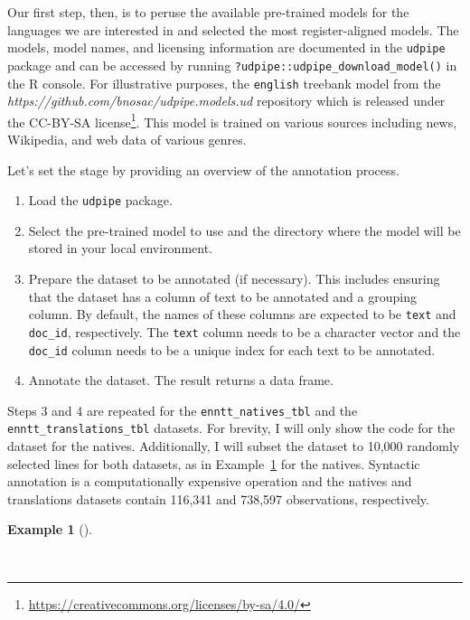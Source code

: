 \documentclass[
  letterpaper,
]{latex/krantz}
\providecommand{\tightlist}{%
  \setlength{\itemsep}{0pt}\setlength{\parskip}{0pt}}\usepackage{longtable,booktabs,array}
\theoremstyle{definition}
\newtheorem{example}{Example}[chapter]
\theoremstyle{remark}
\DeclareRobustCommand{\href}[2]{#2\footnote{\url{#1}}}
\begin{document}
Our first step, then, is to peruse the available pre-trained models for
the languages we are interested in and selected the most
register-aligned models. The models, model names, and licensing
information are documented in the \texttt{udpipe} package and can be
accessed by running \texttt{?udpipe::udpipe\_download\_model()} in the R
console. For illustrative purposes, the \texttt{english} treebank model
from the \emph{https://github.com/bnosac/udpipe.models.ud} repository
which is released under the
\href{https://creativecommons.org/licenses/by-sa/4.0/}{CC-BY-SA
license}. This model is trained on various sources including news,
Wikipedia, and web data of various genres.

Let's set the stage by providing an overview of the annotation process.

\begin{enumerate}
\def\labelenumi{\arabic{enumi}.}
\tightlist
\item
  Load the \texttt{udpipe} package.
\item
  Select the pre-trained model to use and the directory where the model
  will be stored in your local environment.
\item
  Prepare the dataset to be annotated (if necessary). This includes
  ensuring that the dataset has a column of text to be annotated and a
  grouping column. By default, the names of these columns are expected
  to be \texttt{text} and \texttt{doc\_id}, respectively. The
  \texttt{text} column needs to be a character vector and the
  \texttt{doc\_id} column needs to be a unique index for each text to be
  annotated.
\item
  Annotate the dataset. The result returns a data frame.
\end{enumerate}

Steps 3 and 4 are repeated for the \texttt{enntt\_natives\_tbl} and the
\texttt{enntt\_translations\_tbl} datasets. For brevity, I will only
show the code for the dataset for the natives. Additionally, I will
subset the dataset to 10,000 randomly selected lines for both datasets,
as in Example~\ref{exm-td-generation-subset-natives} for the natives.
Syntactic annotation is a computationally expensive operation and the
natives and translations datasets contain 116,341 and 738,597
observations, respectively.

\begin{example}[]\protect\hypertarget{exm-td-generation-subset-natives}{}\label{exm-td-generation-subset-natives}

~

\end{example}
\end{document}
